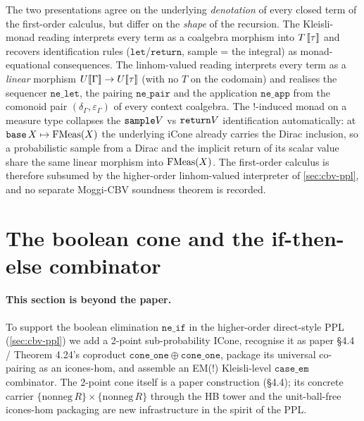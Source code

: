 The two presentations agree on the underlying \emph{denotation} of
every closed term of the first-order calculus, but differ on the
\emph{shape} of the recursion. The Kleisli-monad reading interprets
every term as a coalgebra morphism into $T\,[\![ \tau ]\!]$ and recovers
identification rules ($\mathtt{let}$/$\mathtt{return}$, sample = the
integral) as monad-equational consequences. The linhom-valued reading
interprets every term as a \emph{linear} morphism
$U[\![ \Gamma ]\!] \to U[\![ \tau ]\!]$ (with no $T$ on the codomain) and
realises the sequencer $\mathtt{ne\_let}$, the pairing $\mathtt{ne\_pair}$
and the application $\mathtt{ne\_app}$ from the comonoid pair
$(\delta_\Gamma, \varepsilon_\Gamma)$ of every context coalgebra. The
$\mathord{!}$-induced monad on a measure type collapses the
$\mathtt{sample} V$ vs $\mathtt{return} V$ identification automatically: at
$\mathtt{base}\,X \mapsto \mathrm{FMeas}(X)$ the underlying iCone already carries
the Dirac inclusion, so a probabilistic sample from a Dirac and the
implicit return of its scalar value share the same linear morphism into
$\mathrm{FMeas}(X)$. The first-order calculus is therefore subsumed by the
higher-order linhom-valued interpreter of \autoref{sec:cbv-ppl}, and
no separate Moggi-CBV soundness theorem is recorded.

\section{The boolean cone and the if-then-else combinator}%
\label{sec:cbv-bool}

\paragraph{This section is beyond the paper.}
To support the boolean elimination $\mathtt{ne\_if}$ in the higher-order
direct-style PPL (\autoref{sec:cbv-ppl}) we add a 2-point sub-probability
ICone, recognise it as paper \S4.4 / Theorem 4.24's coproduct
$\mathtt{cone\_one} \oplus \mathtt{cone\_one}$, package its universal
co-pairing as an icones-hom, and assemble an EM(!) Kleisli-level
$\mathtt{case\_em}$ combinator. The 2-point cone itself is a paper
construction (\S4.4); its concrete carrier
$\{\mathrm{nonneg}\,R\} \times \{\mathrm{nonneg}\,R\}$ through the HB
tower and the unit-ball-free icones-hom packaging are new infrastructure
in the spirit of the PPL.

